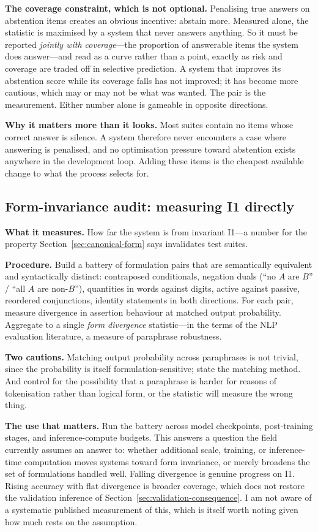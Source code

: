 \textbf{The coverage constraint, which is not optional.} Penalising true answers on
abstention items creates an obvious incentive: abstain more. Measured alone, the
statistic is maximised by a system that never answers anything. So it must be reported
\emph{jointly with coverage}---the proportion of answerable items the system does
answer---and read as a curve rather than a point, exactly as risk and coverage are
traded off in selective prediction. A system that improves its abstention score while
its coverage falls has not improved; it has become more cautious, which may or may not
be what was wanted. The pair is the measurement. Either number alone is gameable in
opposite directions.

\textbf{Why it matters more than it looks.} Most suites contain no items whose
correct answer is silence. A system therefore never encounters a case where
answering is penalised, and no optimisation pressure toward abstention exists
anywhere in the development loop. Adding these items is the cheapest available
change to what the process selects for.

\subsection{Form-invariance audit: measuring I1 directly}
\label{sec:form-audit}

\textbf{What it measures.} How far the system is from invariant I1---a number for
the property Section~\ref{sec:canonical-form} says invalidates test suites.

\textbf{Procedure.} Build a battery of formulation pairs that are semantically
equivalent and syntactically distinct: contraposed conditionals, negation duals
(``no $A$ are $B$'' / ``all $A$ are non-$B$''), quantities in words against digits,
active against passive, reordered conjunctions, identity statements in both
directions. For each pair, measure divergence in assertion behaviour at matched
output probability. Aggregate to a single \emph{form divergence} statistic---in the terms of the NLP
evaluation literature, a measure of paraphrase robustness.

\textbf{Two cautions.} Matching output probability across paraphrases is not
trivial, since the probability is itself formulation-sensitive; state the matching
method. And control for the possibility that a paraphrase is harder for reasons of
tokenisation rather than logical form, or the statistic will measure the wrong
thing.

\textbf{The use that matters.} Run the battery across model checkpoints,
post-training stages, and inference-compute budgets. This answers a question the
field currently assumes an answer to: whether additional scale, training, or
inference-time computation moves systems toward form invariance, or merely broadens
the
set of formulations handled well. Falling divergence is genuine progress on I1.
Rising accuracy with flat divergence is broader coverage, which does not restore
the validation inference of
Section~\ref{sec:validation-consequence}. I am not aware of a systematic published
measurement of this, which is itself worth noting given how much rests on the
assumption.

